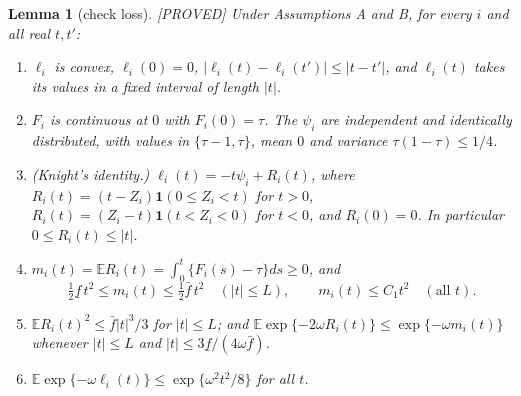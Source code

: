 \documentclass[11pt]{article}
\newtheorem{lemma}{Lemma}
\theoremstyle{definition}
\theoremstyle{remark}
\newcommand{\E}{\mathbb{E}}
\newcommand{\om}{\omega}
\newcommand{\fl}{\underline f}
\newcommand{\fu}{\bar f}
\newcommand{\ind}{\mathbf 1}
\newcommand{\proved}{\textup{[PROVED]}}
\begin{document}
\begin{lemma}[check loss]\label{lem:check}\proved{}
Under Assumptions A and B, for every $i$ and all real $t,t'$:
\begin{enumerate}[label=(\alph*),itemsep=1pt,topsep=2pt]
\item $\ell_i$ is convex, $\ell_i(0)=0$, $|\ell_i(t)-\ell_i(t')|\le|t-t'|$, and $\ell_i(t)$ takes its values in a fixed interval of length $|t|$.
\item $F_i$ is continuous at $0$ with $F_i(0)=\tau$. The $\psi_i$ are independent and identically distributed, with values in $\{\tau-1,\tau\}$, mean $0$ and variance $\tau(1-\tau)\le1/4$.
\item (Knight's identity.) $\ell_i(t)=-t\psi_i+R_i(t)$, where $R_i(t)=(t-Z_i)\ind(0\le Z_i<t)$ for $t>0$, $R_i(t)=(Z_i-t)\ind(t<Z_i<0)$ for $t<0$, and $R_i(0)=0$. In particular $0\le R_i(t)\le|t|$.
\item $m_i(t)=\E R_i(t)=\int_0^t\{F_i(s)-\tau\}ds\ge0$, and
\[
\tfrac12\fl\,t^2\le m_i(t)\le\tfrac12\fu\,t^2\quad(|t|\le L),\qquad m_i(t)\le C_1t^2\quad(\text{all }t).
\]
\item $\E R_i(t)^2\le\fu|t|^3/3$ for $|t|\le L$; and $\E\exp\{-2\om R_i(t)\}\le\exp\{-\om m_i(t)\}$ whenever $|t|\le L$ and $|t|\le3\fl/(4\om\fu)$.
\item $\E\exp\{-\om\ell_i(t)\}\le\exp\{\om^2t^2/8\}$ for all $t$.
\end{enumerate}
\end{lemma}
\end{document}
